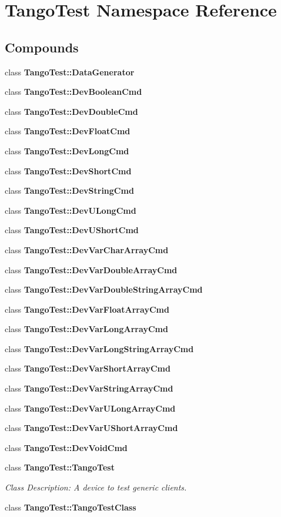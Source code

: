 \section{Tango\-Test Namespace Reference}
\label{namespaceTangoTest}


\subsection*{Compounds}
\begin{CompactItemize}
\item 
class {\bf Tango\-Test::Data\-Generator}
\item 
class {\bf Tango\-Test::Dev\-Boolean\-Cmd}
\item 
class {\bf Tango\-Test::Dev\-Double\-Cmd}
\item 
class {\bf Tango\-Test::Dev\-Float\-Cmd}
\item 
class {\bf Tango\-Test::Dev\-Long\-Cmd}
\item 
class {\bf Tango\-Test::Dev\-Short\-Cmd}
\item 
class {\bf Tango\-Test::Dev\-String\-Cmd}
\item 
class {\bf Tango\-Test::Dev\-ULong\-Cmd}
\item 
class {\bf Tango\-Test::Dev\-UShort\-Cmd}
\item 
class {\bf Tango\-Test::Dev\-Var\-Char\-Array\-Cmd}
\item 
class {\bf Tango\-Test::Dev\-Var\-Double\-Array\-Cmd}
\item 
class {\bf Tango\-Test::Dev\-Var\-Double\-String\-Array\-Cmd}
\item 
class {\bf Tango\-Test::Dev\-Var\-Float\-Array\-Cmd}
\item 
class {\bf Tango\-Test::Dev\-Var\-Long\-Array\-Cmd}
\item 
class {\bf Tango\-Test::Dev\-Var\-Long\-String\-Array\-Cmd}
\item 
class {\bf Tango\-Test::Dev\-Var\-Short\-Array\-Cmd}
\item 
class {\bf Tango\-Test::Dev\-Var\-String\-Array\-Cmd}
\item 
class {\bf Tango\-Test::Dev\-Var\-ULong\-Array\-Cmd}
\item 
class {\bf Tango\-Test::Dev\-Var\-UShort\-Array\-Cmd}
\item 
class {\bf Tango\-Test::Dev\-Void\-Cmd}
\item 
class {\bf Tango\-Test::Tango\-Test}
\begin{CompactList}\small\item\em Class Description: A device to test generic clients.\item\end{CompactList}\item 
class {\bf Tango\-Test::Tango\-Test\-Class}
\end{CompactItemize}
